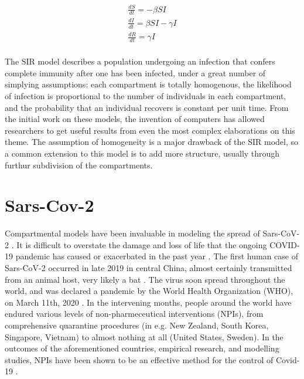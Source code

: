 \begin{eqnarray}
    \frac{dS}{dt} = -\beta S I  \\
    \frac{dI}{dt} = \beta S I - \gamma I\\
    \frac{dR}{dt} = \gamma I\\
    \label{SIR}
\end{eqnarray}

The SIR model describes a population undergoing an infection that confers complete immunity after one has been infected, under a great number of simplying assumptions: each compartment is totally homogenous, the likelihood of infection is proportional to the number of individuals in each compartment, and the probability that an individual recovers is constant per unit time. From the initial work on these models, the invention of computers has allowed researchers to get useful results from even the most complex elaborations on this theme. The assumption of homogeneity is a major drawback of the SIR model, so a common extension to this model is to add more structure, usually through furthur subdivision of the compartments. 

\section{Sars-Cov-2}

Compartmental models have been invaluable in modeling the spread of Sars-CoV-2 \cite{thompson2020epidemiological}. It is difficult to overstate the damage and loss of life that the ongoing COVID-19 pandemic has caused or exacerbated in the past year \cite{miller2020disease,who2021impact}. The first human case of Sars-CoV-2 occurred in late 2019 in central China, almost certainly transmitted from an animal host, very likely a bat \cite{andersen2020proximal,rasmussen2021origins,zhu2020novel}. The virus soon spread throughout the world, and was declared a pandemic by the World Health Organization (WHO), on March 11th, 2020 \cite{who2020announces}. In the intervening months, people around the world have endured various levels of non-pharmeceutical interventions (NPIs), from comprehensive quarantine procedures (in e.g. New Zealand, South Korea, Singapore, Vietnam) to almost nothing at all (United States, Sweden). In the outcomes of the aforementioned countries, empirical research, and modelling studies, NPIs have been shown to be an effective method for the control of Covid-19 \cite{anderson2020estimating,flaxman2020estimating,ferguson2020report,demirguc2020sooner}. 



